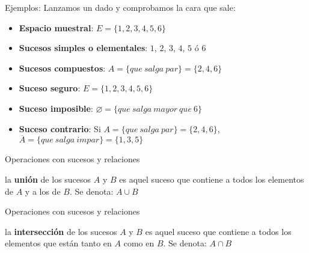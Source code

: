 \documentclass[11pt]{beamer}
\begin{document}
\begin{frame}{Ejemplos:}
Lanzamos un dado y comprobamos la cara que sale:
\begin{itemize}
\item \textbf{Espacio muestral}: $E=\lbrace 1,2,3,4,5,6 \rbrace $
\item \textbf{Sucesos simples o elementales}: $1$, $2$, $3$, $4$, $5$ ó $6$
\item \textbf{Sucesos compuestos}: $A=\lbrace que\ salga\ par\rbrace=\lbrace2,4,6\rbrace$
\item \textbf{Suceso seguro}: $E=\lbrace 1,2,3,4,5,6 \rbrace $
\item \textbf{Suceso imposible}: $\varnothing=\lbrace que\ salga \ mayor \ que \ 6\rbrace$
\item \textbf{Suceso contrario}: Si $A=\lbrace que\ salga\ par\rbrace=\lbrace2,4,6\rbrace$, $\overline{A}=\lbrace que\ salga\ impar\rbrace=\lbrace1,3,5\rbrace$ 
\end{itemize}
\end{frame}


\begin{frame}
{Operaciones con sucesos y relaciones}

\begin{block}{}
la \textbf{unión} de los sucesos $A$ y $B$ es aquel suceso que contiene a todos los elementos de $A$ y a  los de $B$. Se denota: $A\cup B$ 
\end{block}


\end{frame}

\begin{frame}
{Operaciones con sucesos y relaciones}

\begin{block}{}
la \textbf{intersección} de los sucesos $A$ y $B$ es aquel suceso que contiene a todos los elementos que están tanto en $A$ como en $B$. Se denota: $A\cap B$ 
\end{block}


\end{frame}
\end{document}
